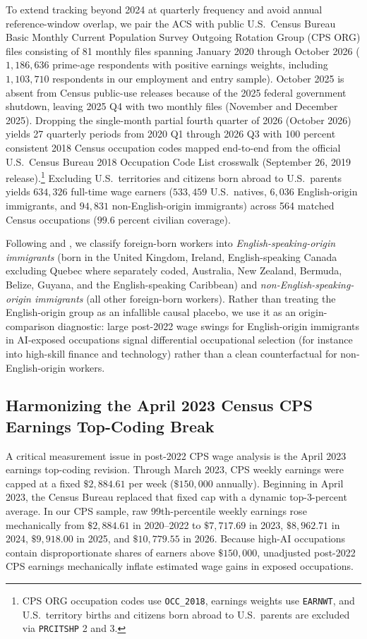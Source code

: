 \documentclass[11pt]{amsart}
\begin{document}
To extend tracking beyond 2024 at quarterly frequency and avoid annual reference-window overlap, we pair the ACS with public U.S.\ Census Bureau Basic Monthly Current Population Survey Outgoing Rotation Group (CPS ORG) files consisting of 81 monthly files spanning January 2020 through October 2026 ($1{,}186{,}636$ prime-age respondents with positive earnings weights, including $1{,}103{,}710$ respondents in our employment and entry sample). October 2025 is absent from Census public-use releases because of the 2025 federal government shutdown, leaving 2025 Q4 with two monthly files (November and December 2025). Dropping the single-month partial fourth quarter of 2026 (October 2026) yields 27 quarterly periods from 2020 Q1 through 2026 Q3 with 100 percent consistent 2018 Census occupation codes mapped end-to-end from the official U.S.\ Census Bureau 2018 Occupation Code List crosswalk (September 26, 2019 release).\footnote{CPS ORG occupation codes use \texttt{OCC\_2018}, earnings weights use \texttt{EARNWT}, and U.S.\ territory births and citizens born abroad to U.S.\ parents are excluded via \texttt{PRCITSHP} 2 and 3.} Excluding U.S.\ territories and citizens born abroad to U.S.\ parents yields $634{,}326$ full-time wage earners ($533{,}459$ U.S.\ natives, $6{,}036$ English-origin immigrants, and $94{,}831$ non-English-origin immigrants) across 564 matched Census occupations ($99.6$ percent civilian coverage).

Following \citet{Song2017} and \citet{Song2026JHC}, we classify foreign-born workers into \emph{English-speaking-origin immigrants} (born in the United Kingdom, Ireland, English-speaking Canada excluding Quebec where separately coded, Australia, New Zealand, Bermuda, Belize, Guyana, and the English-speaking Caribbean) and \emph{non-English-speaking-origin immigrants} (all other foreign-born workers). Rather than treating the English-origin group as an infallible causal placebo, we use it as an origin-comparison diagnostic: large post-2022 wage swings for English-origin immigrants in AI-exposed occupations signal differential occupational selection (for instance into high-skill finance and technology) rather than a clean counterfactual for non-English-origin workers.

\subsection{Harmonizing the April 2023 Census CPS Earnings Top-Coding Break}

A critical measurement issue in post-2022 CPS wage analysis is the April 2023 \citet{CensusBLS2023} earnings top-coding revision. Through March 2023, CPS weekly earnings were capped at a fixed $\$2{,}884.61$ per week ($\$150{,}000$ annually). Beginning in April 2023, the Census Bureau replaced that fixed cap with a dynamic top-3-percent average. In our CPS sample, raw 99th-percentile weekly earnings rose mechanically from $\$2{,}884.61$ in 2020--2022 to $\$7{,}717.69$ in 2023, $\$8{,}962.71$ in 2024, $\$9{,}918.00$ in 2025, and $\$10{,}779.55$ in 2026. Because high-AI occupations contain disproportionate shares of earners above $\$150{,}000$, unadjusted post-2022 CPS earnings mechanically inflate estimated wage gains in exposed occupations.
\end{document}
